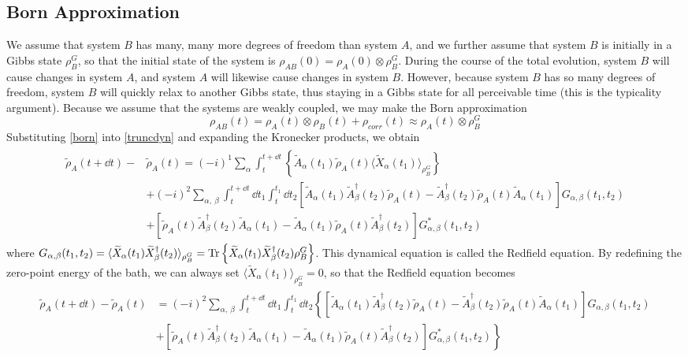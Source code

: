 \documentclass[aps, prl, preprint]{revtex4-1}
\newcommand{\ten}{\otimes}
\newcommand{\Tra}[1]{\Tr\left\{#1\right\}}
\newcommand{\til}[1]{\widetilde{#1}}
\newcommand{\ave}[2]{\langle #1\rangle_{#2}}
\begin{document}
\subsection{Born Approximation}

We assume that system $B$ has many, many more degrees of freedom than system $A$, and we further assume that system $B$ is initially in a Gibbs state $\rho_B^G$, so that the initial state of the system is $\rho_{AB}(0) = \rho_A(0)\ten\rho_B^G$. During the course of the total evolution, system $B$ will cause changes in system $A$, and system $A$ will likewise cause changes in system $B$. However, because system $B$ has so many degrees of freedom, system $B$ will quickly relax to another Gibbs state, thus staying in a Gibbs state for all perceivable time (this is the typicality argument). Because we assume that the systems are weakly coupled, we may make the Born approximation
\begin{equation}\label{born}
\rho_{AB}(t) = \rho_A(t)\ten\rho_B(t) + \rho_{corr}(t)\approx \rho_A(t)\ten\rho_B^G
\end{equation}
Substituting \ref{born} into \ref{truncdyn} and expanding the Kronecker products, we obtain
\begin{align}\label{fuckmyass}
\begin{split}
\til{\rho}_A(t+\dd{t})-&\til{\rho}_A(t) = (-i)^1\sum_{\alpha}\int_t^{t+\dd{t}} \left\{\til{A}_{\alpha}(t_1)\til{\rho}_A(t)\ave{\til{X}_{\alpha}(t_1)}{\rho_B^G}\right\}\\
&+(-i)^2\sum_{\alpha,\ \beta}\int_t^{t+\dd{t}}\dd{t_1}\int_t^{t_1}\dd{t_2}\left[\til{A}_{\alpha}(t_1)\til{A}_{\beta}^{\dag}(t_2)\til{\rho}_A(t)-\til{A}_{\beta}^{\dag}(t_2)\til{\rho}_A(t)\til{A}_{\alpha}(t_1)\right]G_{\alpha,\beta}(t_1,t_2)\\
&+\left[\til{\rho}_A(t)\til{A}_{\beta}^{\dag}(t_2)\til{A}_{\alpha}(t_1)-\til{A}_{\alpha}(t_1)\til{\rho}_A(t)\til{A}_{\beta}^{\dag}(t_2)\right]G_{\alpha,\beta}^{*}(t_1,t_2)
\end{split}
\end{align}
where $G_{\alpha,\beta}(t_1,t_2) =\ave{\til{X}_{\alpha}(t_1)\til{X}_{\beta}^{\dag}(t_2)}{\rho_B^G}= \Tra{\til{X}_{\alpha}(t_1)\til{X}_{\beta}^{\dag}(t_2)\rho_B^G}$. This dynamical equation is called the Redfield equation. By redefining the zero-point energy of the bath, we can always set $\ave{\til{X}_{\alpha}(t_1)}{\rho_B^G} = 0$, so that the Redfield equation becomes
\begin{align}\label{redfield}
\begin{split}
\til{\rho}_A(t+\dd{t})-\til{\rho}_A(t) &= (-i)^2\sum_{\alpha,\ \beta}\int_t^{t+\dd{t}}\dd{t_1}\int_t^{t_1}\dd{t_2}\left\{\left[\til{A}_{\alpha}(t_1)\til{A}_{\beta}^{\dag}(t_2)\til{\rho}_A(t)-\til{A}_{\beta}^{\dag}(t_2)\til{\rho}_A(t)\til{A}_{\alpha}(t_1)\right]G_{\alpha,\beta}(t_1,t_2)\right.\\
&\left.+\left[\til{\rho}_A(t)\til{A}_{\beta}^{\dag}(t_2)\til{A}_{\alpha}(t_1)-\til{A}_{\alpha}(t_1)\til{\rho}_A(t)\til{A}_{\beta}^{\dag}(t_2)\right]G_{\alpha,\beta}^{*}(t_1,t_2)\right\}
\end{split}
\end{align}
\end{document}
